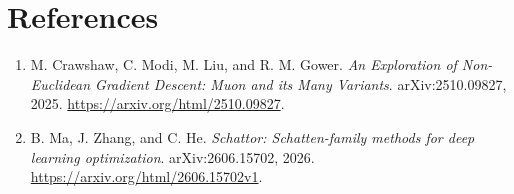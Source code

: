 \documentclass[11pt]{article}
\begin{document}
\section*{References}
\begin{enumerate}
\item
M. Crawshaw, C. Modi, M. Liu, and R. M. Gower.
\emph{An Exploration of Non-Euclidean Gradient Descent: Muon and its Many
Variants}. arXiv:2510.09827, 2025.
\url{https://arxiv.org/html/2510.09827}.
\item
B. Ma, J. Zhang, and C. He.
\emph{Schattor: Schatten-family methods for deep learning optimization}.
arXiv:2606.15702, 2026.
\url{https://arxiv.org/html/2606.15702v1}.
\end{enumerate}
\end{document}
